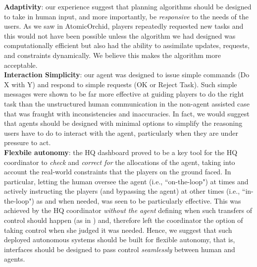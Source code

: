 \noindent \textbf{Adaptivity}: our experience suggest that planning algorithms should be designed to take in human input, and more importantly, be \emph{responsive} to the needs of the users. As we saw in AtomicOrchid, players repeatedly requested new tasks and this would not have been possible unless the algorithm we had designed was computationally efficient but also had the ability to assimilate updates, requests, and constraints dynamically. We believe this makes the algorithm more acceptable.\\

\noindent \textbf{Interaction Simplicity}: our agent was designed to issue simple commands (Do X with Y) and respond to simple requests (OK or Reject Task). Such simple messages were shown to be far more effective at guiding players to do the right task than the unstructured human communication in the non-agent assisted case that was fraught with inconsistencies and inaccuracies. In fact, we would suggest that agents should be designed with minimal options to simplify the reasoning users have to do to interact with the agent, particularly when they are under pressure to act.\\

\noindent \textbf{Flexbile autonomy}: the HQ dashboard proved to be a key tool for the HQ coordinator to \emph{check} and \emph{correct for} the allocations of the agent, taking into account the real-world constraints that the players on the ground faced. In particular, letting the human oversee the agent (i.e., ``on-the-loop") at times and actively instructing  the players (and bypassing the agent) at other times (i.e., ``in-the-loop") as and when needed, was seen to be particularly effective. This was achieved by the HQ coordinator \emph{without the agent} defining when such transfers of control should happen (as in \cite{scerri:etal:2005}) and, therefore left the coordinator the option of taking control when she judged it was needed. Hence, we suggest that such deployed autonomous systems should be built for flexible autonomy, that is, interfaces should be designed to pass control \emph{seamlessly} between human and agents.


